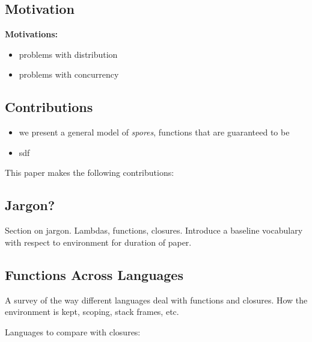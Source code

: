 \documentclass{llncs}
\begin{document}



\subsection{Motivation}

{\bf Motivations:}
\begin{itemize}
\item problems with distribution
\item problems with concurrency
\end{itemize}

\subsection{Contributions}

\begin{itemize}
\item we present a general model of \textit{spores}, functions that are guaranteed to be 
\item sdf
\end{itemize}


This paper makes the following contributions:

\subsection{Jargon?}

Section on jargon. Lambdas, functions, closures. Introduce a baseline
vocabulary with respect to environment for duration of paper.

\subsection{Functions Across Languages}

A survey of the way different languages deal with functions and closures. How
the environment is kept, scoping, stack frames, etc.

Languages to compare with closures:
\end{document}

